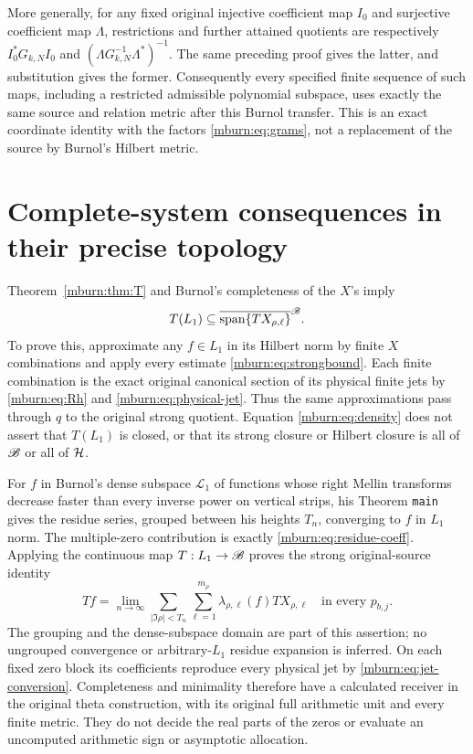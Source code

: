 More generally, for any fixed original injective coefficient
map $I_0$ and surjective coefficient map $\Lambda$, restrictions
and further attained quotients are respectively
$I_0^*G_{k,N}I_0$ and
$(\Lambda G_{k,N}^{-1}\Lambda^*)^{-1}$.
The same preceding proof gives the latter, and substitution
gives the former. Consequently every specified finite
sequence of such maps, including a restricted admissible
polynomial subspace, uses exactly the same source and
relation metric after this Burnol transfer. This is an exact
coordinate identity with the factors \eqref{mburn:eq:grams}, not
a replacement of the source by Burnol's Hilbert metric.

\section{Complete-system consequences in their precise topology}

Theorem~\ref{mburn:thm:T} and Burnol's completeness of the $X$'s imply
\begin{equation}\label{mburn:eq:density}
 T(L_1)\subseteq
 \overline{\operatorname{span}\{T X_{\rho,\ell}\}}^{\mathscr B}.
\end{equation}
To prove this, approximate any $f\in L_1$ in its Hilbert
norm by finite $X$ combinations and apply every estimate
\eqref{mburn:eq:strongbound}. Each finite combination is the exact
original canonical section of its physical finite jets by
\eqref{mburn:eq:Rh} and \eqref{mburn:eq:physical-jet}. Thus the same
approximations pass through $q$ to the original strong quotient.
Equation \eqref{mburn:eq:density} does not assert that $T(L_1)$
is closed, or that its strong closure or Hilbert closure is
all of $\mathscr B$ or all of $\mathcal H$.

For $f$ in Burnol's dense subspace $\mathcal L_1$ of functions
whose right Mellin transforms decrease faster than every
inverse power on vertical strips, his Theorem \texttt{main}
gives the residue series, grouped between his heights $T_n$,
converging to $f$ in $L_1$ norm. The multiple-zero contribution
is exactly \eqref{mburn:eq:residue-coeff}. Applying the continuous
map $T:L_1\to\mathscr B$ proves the strong original-source identity
\begin{equation}\label{mburn:eq:strong-residue}
 Tf=\lim_{n\to\infty}
 \sum_{|\Im\rho|<T_n}\sum_{\ell=1}^{m_\rho}
                         \lambda_{\rho,\ell}(f)T X_{\rho,\ell}
                    \quad\text{in every }p_{b,j}.
\end{equation}
The grouping and the dense-subspace domain are part of this
assertion; no ungrouped convergence or arbitrary-$L_1$
residue expansion is inferred. On each fixed zero block its
coefficients reproduce every physical jet by
\eqref{mburn:eq:jet-conversion}. Completeness and minimality
therefore have a calculated receiver in the original
theta construction, with its original full arithmetic
unit and every finite metric. They do not decide the
real parts of the zeros or evaluate an uncomputed
arithmetic sign or asymptotic allocation.

